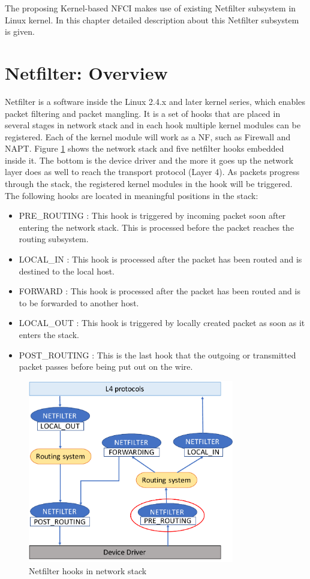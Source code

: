 The proposing Kernel-based NFCI makes use of existing Netfilter subsystem in Linux kernel. In this chapter detailed description about this Netfilter subsystem is given. 

\section{Netfilter: Overview}
Netfilter is a software inside the Linux 2.4.x and later kernel series, which enables packet filtering and packet mangling. It is a set of hooks that are placed in several stages in network stack and in each hook multiple kernel modules can be registered. Each of the kernel module will work as a NF, such as Firewall and NAPT. 
Figure \ref{fig: netfilter_system} shows the network stack and five netfilter hooks embedded inside it. The bottom is the device driver and the more it goes up the network layer does as well to reach the transport protocol (Layer 4). As packets progress through the stack, the registered kernel modules in the hook will be triggered. 
The following hooks are located in meaningful positions in the stack:
\begin{itemize}
	\item PRE\_ROUTING : This hook is triggered by incoming packet soon after entering the network stack. This is processed before the packet reaches the routing subsystem.
	\item LOCAL\_IN : This hook is processed after the packet has been routed and is destined to the local host.
	\item FORWARD : This hook is processed after the packet has been routed and is to be forwarded to another host. 
	\item LOCAL\_OUT : This hook is triggered by locally created packet as soon as it enters the stack.
	\item POST\_ROUTING : This is the last hook that the outgoing or transmitted packet passes before being put out on the wire. 
\end{itemize}

\begin{figure}
	\centering
	\includegraphics[width=90mm]{pics/netfilter_system.pdf}
	\caption{Netfilter hooks in network stack}
	\label{fig: netfilter_system}
\end{figure}

